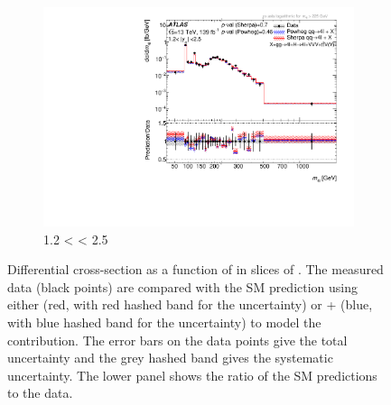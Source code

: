\begin{figure}[htb!]
\begin{subfigure}{.49\textwidth}
      \includegraphics[width=.99\linewidth]{Figures/m4l/UnfoldedResults/linlog_Unfolded_Data_m4l_y4l1dot2-2dot5.pdf}  \caption{1.2 < \yFourL{} < 2.5}\label{fig:sub-fifth}
    \end{subfigure}
    \caption{Differential cross-section as a function of \mFourL{} in slices of \yFourL{}. The measured data (black points) are  compared with the SM prediction using either \SHERPA{} (red, with red hashed band for the uncertainty) or \POWHEG{} + \pythia{} (blue, with blue hashed band for the uncertainty) to model the \qqFourL{} contribution. The error bars on the data points give the total uncertainty and the grey hashed band gives the systematic uncertainty. \Pvalue{} The  lower panel shows the ratio of the SM predictions to the data.}
    \label{fig:m4l_y4l}
\end{figure}

